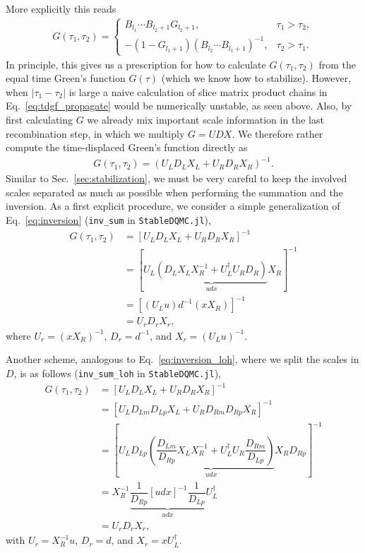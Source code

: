 \documentclass[%
 reprint,
superscriptaddress,
citeautoscript,
showpacs,
 amsmath,amssymb,
 aps,
 prb,
longbibliography,
]{revtex4-1}
\begin{document}
More explicitly this reads
\begin{align}
	G(\tau_1, \tau_2) = \begin{cases}
	B_{l_1} \cdots B_{l_2 + 1} G_{l_2 + 1}, &\tau_1 > \tau_2,\\
	- \left( 1 - G_{l_1 + 1} \right) \left( B_{l_2} \cdots B_{l_1 + 1}\right)^{-1}, &\tau_2 > \tau_1.
	\end{cases} \label{eq:tdgf_propagate}
\end{align}
In principle, this gives us a prescription for how to calculate $G(\tau_1, \tau_2)$ from the equal time Green's function $G(\tau)$ (which we know how to stabilize). However, when $|\tau_1 - \tau_2|$ is large a naive calculation of slice matrix product chains in Eq.~\ref{eq:tdgf_propagate} would be numerically unstable, as seen above. Also, by first calculating $G$ we already mix important scale information in the last recombination step, in which we multiply $G = UDX$. We therefore rather compute the time-displaced Green's function directly as
\begin{align}
	G(\tau_1, \tau_2) = (U_L D_L X_L + U_R D_R X_R)^{-1}.
\end{align}
Similar to Sec.~\ref{sec:stabilization}, we must be very careful to keep the involved scales separated as much as possible when performing the summation and the inversion.
As a first explicit procedure, we consider a simple generalization of Eq.~\ref{eq:inversion} (\texttt{inv\_sum} in \texttt{StableDQMC.jl}),
\begin{align}
	G(\tau_1, \tau_2) &= [U_L D_L X_L + U_R D_R X_R]^{-1} \nonumber\\
	&= [U_L \underbrace{(D_L X_L X_R^{-1} + U_L^\dagger U_R D_R)}_{udx} X_R ]^{-1} \nonumber\\
	&= [(U_L u) d^{-1} (x X_R)]^{-1} \\
	&= U_r D_r X_r, 
\end{align}
where $U_r = (x X_R)^{-1}$, $D_r = d^{-1}$, and $X_r = (U_L u)^{-1}$.

Another scheme, analogous to Eq.~\ref{eq:inversion_loh}, where we split the scales in $D$, is as follows (\texttt{inv\_sum\_loh} in \texttt{StableDQMC.jl}),
\begin{align}
	G(\tau_1, \tau_2) &= [U_L D_L X_L + U_R D_R X_R]^{-1} \nonumber\\
	&= [U_L D_{Lm} D_{Lp} X_L + U_R D_{Rm} D_{Rp} X_R]^{-1} \nonumber\\
	&= \left[U_L D_{Lp} \underbrace{\left( \dfrac{D_{Lm}}{D_{Rp}} X_L X_R^{-1} + U_L^\dagger U_R \dfrac{D_{Rm}}{D_{Lp}} \right)}_{udx} X_R D_{Rp} \right]^{-1} \nonumber\\
	&= X_R^{-1} \underbrace{\dfrac{1}{D_{Rp}} [udx]^{-1} \dfrac{1}{D_{Lp}}}_{udx} U_L^\dagger \\
	&= U_r D_r X_r,
\end{align}
with $U_r = X_R^{-1} u$, $D_r = d$, and $X_r = x U_L^\dagger$.







\clearpage

\end{document}

